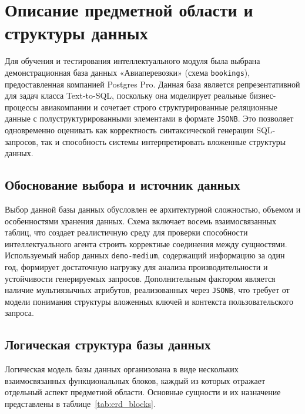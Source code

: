 \section{Описание предметной области и структуры данных}

Для обучения и тестирования интеллектуального модуля была выбрана демонстрационная база данных «Авиаперевозки» (схема \texttt{bookings}), предоставленная компанией Postgres Pro. Данная база является репрезентативной для задач класса Text-to-SQL, поскольку она моделирует реальные бизнес-процессы авиакомпании и сочетает строго структурированные реляционные данные с полуструктурированными элементами в формате \texttt{JSONB}. Это позволяет одновременно оценивать как корректность синтаксической генерации SQL-запросов, так и способность системы интерпретировать вложенные структуры данных.

\subsection{Обоснование выбора и источник данных}

Выбор данной базы данных обусловлен ее архитектурной сложностью, объемом и особенностями хранения данных. Схема включает восемь взаимосвязанных таблиц, что создает реалистичную среду для проверки способности интеллектуального агента строить корректные соединения между сущностями. Используемый набор данных \texttt{demo-medium}, содержащий информацию за один год, формирует достаточную нагрузку для анализа производительности и устойчивости генерируемых запросов. Дополнительным фактором является наличие мультиязычных атрибутов, реализованных через \texttt{JSONB}, что требует от модели понимания структуры вложенных ключей и контекста пользовательского запроса.

\subsection{Логическая структура базы данных}

Логическая модель базы данных организована в виде нескольких взаимосвязанных функциональных блоков, каждый из которых отражает отдельный аспект предметной области. Основные сущности и их назначение представлены в таблице~\ref{tab:erd_blocks}.

